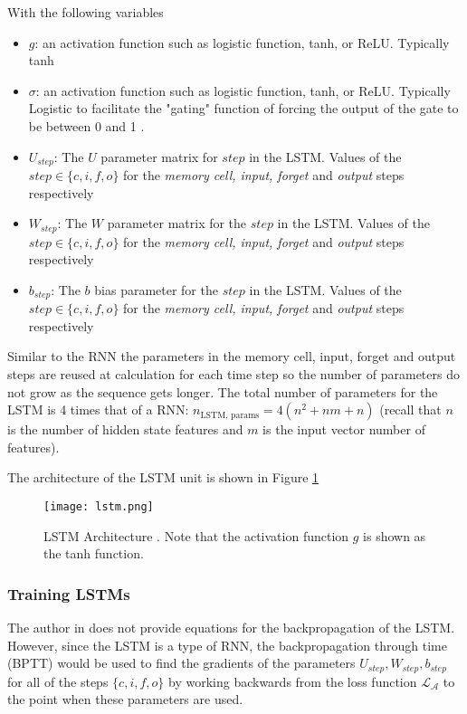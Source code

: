 With the following variables

\begin{itemize}
    \item $g$: an activation function such as logistic function, tanh, or ReLU. Typically tanh \cite{salemRecurrentNeuralNetworks2022}
    \item $\sigma$: an activation function such as logistic function, tanh, or ReLU. Typically Logistic to facilitate the "gating" function of forcing the output of the gate to be between 0 and 1 \cite{salemRecurrentNeuralNetworks2022}.
    \item $U_{step}$: The $U$ parameter matrix for $step$ in the LSTM. Values of the $step \in \{c, i, f, o\}$ for the \textit{memory cell, input, forget} and \textit{output} steps respectively
    \item $W_{step}$: The $W$ parameter matrix for the $step$ in the LSTM. Values of the $step \in \{c, i, f, o\}$ for the \textit{memory cell, input, forget} and \textit{output} steps respectively
    \item $b_{step}$: The $b$ bias parameter for the $step$ in the LSTM. Values of the $step \in \{c, i, f, o\}$ for the \textit{memory cell, input, forget} and \textit{output} steps respectively
\end{itemize}

Similar to the RNN the parameters in the memory cell, input, forget and output steps are reused at calculation for each time step so the number of parameters do not grow as the sequence gets longer. The total number of parameters for the LSTM is 4 times that of a RNN: $n_\text{LSTM, params} = 4(n^2 + nm + n)$ (recall that $n$ is the number of hidden state features and $m$ is the input vector number of features).

The architecture of the LSTM unit is shown in Figure \ref{fig:lstm-arch}

\begin{figure}[ht]
    \centering
    \texttt{[image: lstm.png]}
    \caption{LSTM Architecture \cite{salemRecurrentNeuralNetworks2022}. Note that the activation function $g$ is shown as the tanh function.}
    \label{fig:lstm-arch}
\end{figure}

\subsubsection{Training LSTMs}
The author in \cite{salemRecurrentNeuralNetworks2022} does not provide equations for the backpropagation of the LSTM. However, since the LSTM is a type of RNN, the backpropagation through time (BPTT) would be used to find the gradients of the parameters $U_{step}, W_{step}, b_{step}$ for all of the steps $\{c, i, f, o\}$ by working backwards from the loss function $\mathcal{L}_\mathcal{A}$ to the point when these parameters are used. 


